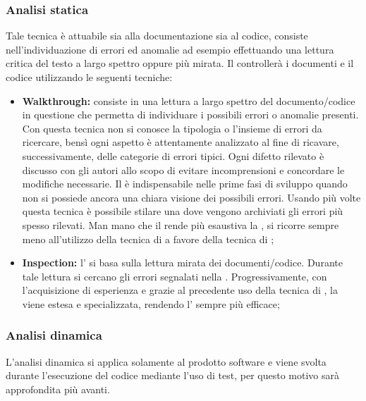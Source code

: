 \documentclass[12pt,a4paper]{article}
\begin{document}
\subsubsection{Analisi statica}
Tale tecnica è attuabile sia alla documentazione sia al codice, consiste nell'individuazione di errori ed anomalie ad esempio effettuando una lettura critica del testo a largo spettro oppure più mirata. Il \VR{} controllerà i documenti e il codice utilizzando le seguenti tecniche:
    \begin{itemize}
      \item \textbf{Walkthrough:} consiste in una lettura a largo spettro del documento/codice in questione che permetta di individuare i possibili errori o anomalie presenti. Con questa tecnica non si conosce la tipologia o l'insieme di errori da ricercare, bensì ogni aspetto è attentamente analizzato al fine di ricavare, successivamente, delle categorie di errori tipici. Ogni difetto rilevato è discusso con gli autori allo scopo di evitare incomprensioni e concordare le modifiche necessarie. Il \textit{} è indispensabile nelle prime fasi di sviluppo quando non si possiede ancora una chiara visione dei possibili errori. Usando più volte questa tecnica è possibile stilare una  dove vengono archiviati gli errori più spesso rilevati. Man mano che il \VR{} rende più esaustiva la , si ricorre sempre meno all'utilizzo della tecnica di \textit{} a favore della tecnica di \textit{};
      \item \textbf{Inspection:} l'\textit{} si basa sulla lettura mirata dei documenti/codice. Durante tale lettura si cercano gli errori segnalati nella . Progressivamente, con l'acquisizione di esperienza e grazie al precedente uso della tecnica di \textit{}, la  viene estesa e specializzata, rendendo l'\textit{} sempre più efficace;
        \end{itemize}

\subsubsection{ Analisi dinamica}
L’analisi dinamica si applica solamente al prodotto software e viene svolta durante l’esecuzione del codice mediante l’uso di test, per questo motivo sarà approfondita più avanti.
\end{document}
